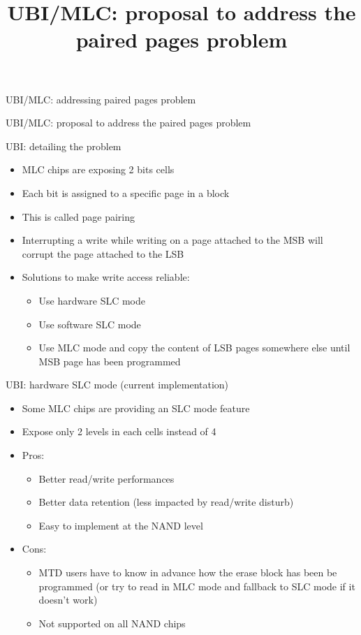 \documentclass[obeyspaces,spaces,hyphens,dvipsnames]{beamer}
\title{UBI/MLC: proposal to address the paired pages problem}
\institute{Free Electrons}
\begin{document}
\begin{frame}{UBI/MLC: addressing paired pages problem}
  \begin{center}
    \huge
    UBI/MLC: proposal to address the paired pages problem
  \end{center}
\end{frame}

\AtBeginSection
{
}

\AtBeginSubsection
{
}

\begin{frame}{UBI: detailing the problem}
  \begin{itemize}
  \item MLC chips are exposing 2 bits cells
  \item Each bit is assigned to a specific page in a block
  \item This is called page pairing
  \item Interrupting a write while writing on a page attached
        to the MSB will corrupt the page attached to the LSB
  \item Solutions to make write access reliable:
    \begin{itemize}
    \item Use hardware SLC mode
    \item Use software SLC mode
    \item Use MLC mode and copy the content of LSB pages
          somewhere else until MSB page has been programmed
    \end{itemize}
  \end{itemize}
\end{frame}

\begin{frame}{UBI: hardware SLC mode (current implementation)}
  \begin{itemize}
  \item Some MLC chips are providing an SLC mode feature
  \item Expose only 2 levels in each cells instead of 4
  \item Pros:
    \begin{itemize}
    \item Better read/write performances
    \item Better data retention (less impacted by read/write disturb)
    \item Easy to implement at the NAND level
    \end{itemize}
  \item Cons:
    \begin{itemize}
    \item MTD users have to know in advance how the erase block has been
	  be programmed (or try to read in MLC mode and fallback to SLC
	  mode if it doesn't work)
    \item Not supported on all NAND chips
    \end{itemize}
  \end{itemize}
\end{frame}
\end{document}
